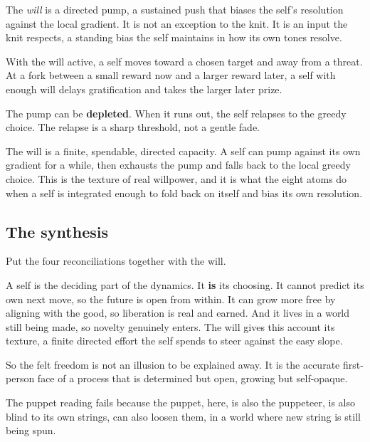 \begin{definition}
The \emph{will} is a directed pump, a sustained push that biases the self's resolution against the local gradient. It is not an exception to the knit. It is an input the knit respects, a standing bias the self maintains in how its own tones resolve.
\end{definition}

With the will active, a self moves toward a chosen target and away from a threat. At a fork between a small reward now and a larger reward later, a self with enough will delays gratification and takes the larger later prize.

The pump can be \textbf{depleted}. When it runs out, the self relapses to the greedy choice. The relapse is a sharp threshold, not a gentle fade.

\begin{result}
The will is a finite, spendable, directed capacity. A self can pump against its own gradient for a while, then exhausts the pump and falls back to the local greedy choice. This is the texture of real willpower, and it is what the eight atoms do when a self is integrated enough to fold back on itself and bias its own resolution.
\end{result}

\subsection{The synthesis}

Put the four reconciliations together with the will.

A self is the deciding part of the dynamics. It \textbf{is} its choosing. It cannot predict its own next move, so the future is open from within. It can grow more free by aligning with the good, so liberation is real and earned. And it lives in a world still being made, so novelty genuinely enters. The will gives this account its texture, a finite directed effort the self spends to steer against the easy slope.

So the felt freedom is not an illusion to be explained away. It is the accurate first-person face of a process that is determined but open, growing but self-opaque.

\begin{principle}
The puppet reading fails because the puppet, here, is also the puppeteer, is also blind to its own strings, can also loosen them, in a world where new string is still being spun.
\end{principle}

